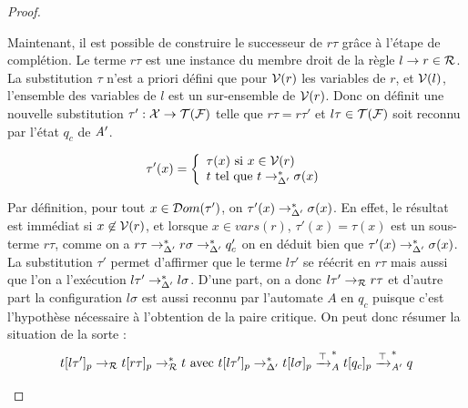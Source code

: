 \begin{proof}
\begin{enumerate}
\begin{itemize}
    Maintenant, il est possible de construire le successeur de $r\tau$ grâce à l'étape de complétion.
    Le terme $r\tau$ est une instance du membre droit de la règle $l \rightarrow r \in \mathcal R$. La substitution $\tau$
    n'est a priori défini que pour $\mathcal V(r)$ les variables de $r$, et $\mathcal V(l)$, l'ensemble des variables de $l$
    est un sur-ensemble de $\mathcal V(r)$. Donc on définit une nouvelle substitution $\tau' :\mathcal X\rightarrow \mathcal{T(F)}$ telle que
    $r\tau = r\tau'$ et $l\tau \in \mathcal{T(F)}$ soit reconnu par l'état $q_c$ de $\mathit A'$. 
 
    \[
    \tau'(x) = \left\{
      \begin{array}{l}
        \tau(x) \textrm{ si } x \in \mathcal V(r)\\
        t \textrm{ tel que } t \rightarrow^*_{\Delta'} \sigma(x)
      \end{array}\right.
    \]

    Par définition, pour tout $x \in \mathcal{D}om(\tau')$, on $\tau'(x) \rightarrow^*_{\Delta'} \sigma(x)$. 
    En effet, le résultat est immédiat si $x\not\in\mathcal V(r)$, et lorsque $x\in vars(r)$, $\tau'(x)=\tau(x)$ est un sous-terme $r\tau$,
    comme on a $r\tau \rightarrow^*_{\Delta'} r\sigma \rightarrow^*_{\Delta'} q_c'$ on en déduit bien  que $\tau'(x) \rightarrow^*_{\Delta'} \sigma(x)$.
    La substitution $\tau'$ permet d'affirmer que le terme $l\tau'$ se réécrit en $r\tau$ mais aussi que l'on a l'exécution 
    $l\tau'\rightarrow^*_{\Delta'} l\sigma$. D'une part, on a donc $l\tau' \rightarrow_\mathcal R r\tau$ et d'autre part la configuration $l\sigma$
    est aussi reconnu par l'automate $A$ en $q_c$ puisque c'est l'hypothèse nécessaire à l'obtention de la paire critique.
    On peut donc résumer la situation de la sorte :
    \[t[l\tau']_p \rightarrow_\mathcal R t[r\tau]_p\rightarrow^*_\mathcal R t\textrm{ avec }  t[l\tau']_p \rightarrow^*_{\Delta'} t[l\sigma]_p \xrightarrow{\top}^*_{A} t[q_c]_p \xrightarrow{\top}^*_{\mathit A'} q\]
  

\end{itemize}
\end{enumerate}
\end{proof}
